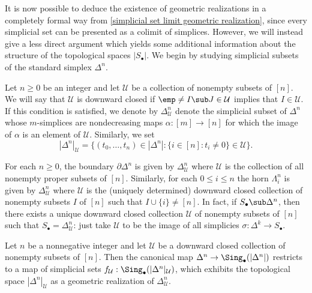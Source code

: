 It is now possible to deduce the existence of geometric realizations in a completely formal way from \cref{simplicial set limit geometric realization}, since every simplicial set can be presented as a colimit of simplices. However, we will instead give a less direct argument which yields some additional information about the structure of the topological spaces $|S_\bullet|$. We begin by studying simplicial subsets of the standard simplex $\Delta^n$.\par
Let $n\geq 0$ be an integer and let $\mathcal{U}$ be a collection of nonempty subsets of $[n]$. We will say that $\mathcal{U}$ is downward closed if $\emp\neq I\sub J\in\mathcal{U}$ implies that $I\in\mathcal{U}$. If this condition is satisfied, we denote by $\Delta^n_{\mathcal{U}}$ denote the simplicial subset of $\Delta^n$ whose $m$-simplices are nondecreasing maps $\alpha:[m]\to[n]$ for which the image of $\alpha$ is an element of $\mathcal{U}$. Similarly, we set
\[|\Delta^n|_{\mathcal{U}}=\{(t_0,\dots,t_n)\in|\Delta^n|:\{i\in[n]:t_i\neq 0\}\in\mathcal{U}\}.\]
\begin{example}\label{simplicial set boundary horn given downward set}
For each $n\geq 0$, the boundary $\partial\Delta^n$ is given by $\Delta^n_\mathcal{U}$ where $\mathcal{U}$ is the collection of all nonempty proper subsets of $[n]$. Similarly, for each $0\leq i\leq n$ the horn $\Lambda^n_i$ is given by $\Delta^n_\mathcal{U}$ where $\mathcal{U}$ is the (uniquely determined) downward closed collection of nonempty subsets $I$ of $[n]$ such that $I\cup\{i\}\neq[n]$. In fact, if $S_\bullet\sub\Delta^n$, then there exists a unique downward closed collection $\mathcal{U}$ of nonempty subsets of $[n]$ such that $S_\bullet=\Delta^n_\mathcal{U}$: just take $\mathcal{U}$ to be the image of all simplicies $\sigma:\Delta^k\to S_\bullet$.
\end{example}
\begin{proposition}\label{simplicial set Delta^n_U geometric realization}
Let $n$ be a nonnegative integer and let $\mathcal{U}$ be a downward closed collection of nonempty subsets of $[n]$. Then the canonical map $\Delta^n\to\Sing_\bullet(|\Delta^n|)$ restricts to a map of simplicial sets $f_\mathcal{U}:\Sing_\bullet(|\Delta^n|_{\mathcal{U}})$, which exhibits the topological space $|\Delta^n|_{\mathcal{U}}$ as a geometric realization of $\Delta^n_\mathcal{U}$.
\end{proposition}
